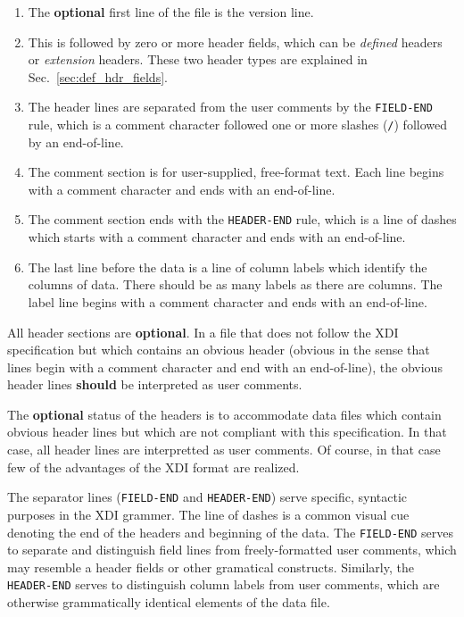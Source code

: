 \documentclass{article}
\newcommand{\xdi}{\textsf{XDI}}
\begin{document}
\begin{enumerate}
\item The \textbf{optional} first line of the file is the version
  line.
\item This is followed by zero or more header fields, which can be
  \textit{defined} headers or \textit{extension} headers.  These two
  header types are explained in Sec.~\ref{sec:def_hdr_fields}.
\item The header lines are separated from the user comments by the
  \texttt{FIELD-END} rule, which is a comment character followed one
  or more slashes (\texttt{/}) followed by an end-of-line.
\item The comment section is for user-supplied, free-format text.
  Each line begins with a comment character and ends with an
  end-of-line.
\item The comment section ends with the \texttt{HEADER-END} rule,
  which is a line of dashes which starts with a comment character and
  ends with an end-of-line.
\item The last line before the data is a line of column labels which
  identify the columns of data.  There should be as many labels as
  there are columns.  The label line begins with a comment character
  and ends with an end-of-line.
\end{enumerate}

All header sections are \textbf{optional}.  In a file that does not
follow the {\xdi} specification but which contains an obvious header
(obvious in the sense that lines begin with a comment character and
end with an end-of-line), the obvious header lines \textbf{should} be
interpreted as user comments.

The \textbf{optional} status of the headers is to accommodate data
files which contain obvious header lines but which are not compliant
with this specification.  In that case, all header lines are
interpretted as user comments.  Of course, in that case few of the
advantages of the {\xdi} format are realized.

The separator lines (\texttt{FIELD-END} and \texttt{HEADER-END}) serve
specific, syntactic purposes in the {\xdi} grammer.  The line of
dashes is a common visual cue denoting the end of the headers and
beginning of the data.  The \texttt{FIELD-END} serves to separate and
distinguish field lines from freely-formatted user comments, which may
resemble a header fields or other gramatical constructs.  Similarly,
the \texttt{HEADER-END} serves to distinguish column labels from user
comments, which are otherwise grammatically identical elements of the
data file.
\end{document}
